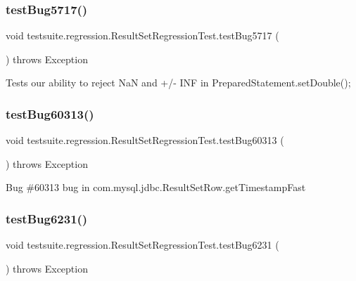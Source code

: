 \subsubsection{\texorpdfstring{test\+Bug5717()}{testBug5717()}}
{\footnotesize\ttfamily void testsuite.\+regression.\+Result\+Set\+Regression\+Test.\+test\+Bug5717 (\begin{DoxyParamCaption}{ }\end{DoxyParamCaption}) throws Exception}

Tests our ability to reject NaN and +/-\/ I\+NF in Prepared\+Statement.\+set\+Double(); \mbox{\label{classtestsuite_1_1regression_1_1_result_set_regression_test_a0b66981060f0cf894fcac0ffacf7280d}} 
\subsubsection{\texorpdfstring{test\+Bug60313()}{testBug60313()}}
{\footnotesize\ttfamily void testsuite.\+regression.\+Result\+Set\+Regression\+Test.\+test\+Bug60313 (\begin{DoxyParamCaption}{ }\end{DoxyParamCaption}) throws Exception}

Bug \#60313 bug in com.\+mysql.\+jdbc.\+Result\+Set\+Row.\+get\+Timestamp\+Fast \mbox{\label{classtestsuite_1_1regression_1_1_result_set_regression_test_aeb09775b50784baa772c121c33812f23}} 
\subsubsection{\texorpdfstring{test\+Bug6231()}{testBug6231()}}
{\footnotesize\ttfamily void testsuite.\+regression.\+Result\+Set\+Regression\+Test.\+test\+Bug6231 (\begin{DoxyParamCaption}{ }\end{DoxyParamCaption}) throws Exception}

